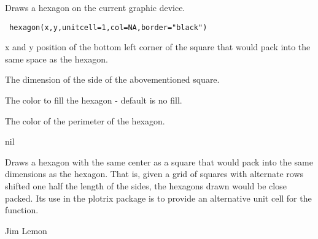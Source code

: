 \begin{Description}\relax
Draws a hexagon on the current graphic device.
\end{Description}
\begin{Usage}
\begin{verbatim}
 hexagon(x,y,unitcell=1,col=NA,border="black")
\end{verbatim}
\end{Usage}
\begin{Arguments}
\begin{ldescription}
\item[\code{x,y}] x and y position of the bottom left corner of the square that
would pack into the same space as the hexagon.
\item[\code{unitcell}] The dimension of the side of the abovementioned square.
\item[\code{col}] The color to fill the hexagon - default is no fill.
\item[\code{border}] The color of the perimeter of the hexagon.
\end{ldescription}
\end{Arguments}
\begin{Value}
nil
\end{Value}
\begin{Note}\relax
Draws a hexagon with the same center as a square that would pack into the
same dimensions as the hexagon. That is, given a grid of squares with
alternate rows shifted one half the length of the sides, the hexagons
drawn would be close packed. Its use in the plotrix package is to provide
an alternative unit cell for the  function.
\end{Note}
\begin{Author}\relax
Jim Lemon
\end{Author}
\begin{SeeAlso}\relax
{}
\end{SeeAlso}

